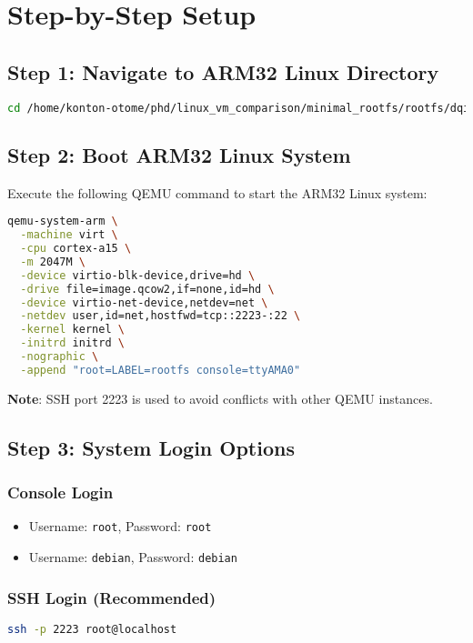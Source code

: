 \documentclass{article}
\begin{document}
\section{Step-by-Step Setup}

\subsection{Step 1: Navigate to ARM32 Linux Directory}

\begin{lstlisting}[language=bash]
cd /home/konton-otome/phd/linux_vm_comparison/minimal_rootfs/rootfs/dqib_armhf-virt
\end{lstlisting}

\subsection{Step 2: Boot ARM32 Linux System}

Execute the following QEMU command to start the ARM32 Linux system:

\begin{lstlisting}[language=bash]
qemu-system-arm \
  -machine virt \
  -cpu cortex-a15 \
  -m 2047M \
  -device virtio-blk-device,drive=hd \
  -drive file=image.qcow2,if=none,id=hd \
  -device virtio-net-device,netdev=net \
  -netdev user,id=net,hostfwd=tcp::2223-:22 \
  -kernel kernel \
  -initrd initrd \
  -nographic \
  -append "root=LABEL=rootfs console=ttyAMA0"
\end{lstlisting}

\textbf{Note}: SSH port 2223 is used to avoid conflicts with other QEMU instances.

\subsection{Step 3: System Login Options}

\subsubsection{Console Login}
\begin{itemize}
    \item Username: \texttt{root}, Password: \texttt{root}
    \item Username: \texttt{debian}, Password: \texttt{debian}
\end{itemize}

\subsubsection{SSH Login (Recommended)}
\begin{lstlisting}[language=bash]
ssh -p 2223 root@localhost
\end{lstlisting}
\end{document}
